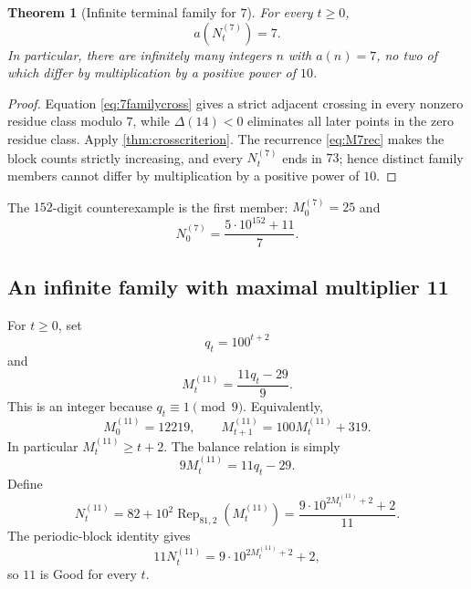 \documentclass[11pt]{article}
\newtheorem{theorem}{Theorem}[section]
\newcommand{\Def}{\Delta}
\begin{document}
\begin{theorem}[Infinite terminal family for $7$]\label{thm:infinite7}
For every $t\ge0$,
\[
 a(N^{(7)}_t)=7.
\]
In particular, there are infinitely many integers $n$ with $a(n)=7$, no two of which differ by multiplication by a positive power of $10$.
\end{theorem}

\begin{proof}
Equation \eqref{eq:7familycross} gives a strict adjacent crossing in every nonzero residue class modulo $7$, while $\Def(14)<0$ eliminates all later points in the zero residue class.  Apply \cref{thm:crosscriterion}.  The recurrence \eqref{eq:M7rec} makes the block counts strictly increasing, and every $N^{(7)}_t$ ends in $73$; hence distinct family members cannot differ by multiplication by a positive power of $10$.
\end{proof}

The $152$-digit counterexample is the first member: $M^{(7)}_0=25$ and
\[
 N^{(7)}_0=\frac{5\cdot10^{152}+11}{7}.
\]

\subsection{An infinite family with maximal multiplier 11}
For $t\ge0$, set
\begin{equation}\label{eq:q11family}
 q_t=100^{t+2}
\end{equation}
and
\begin{equation}\label{eq:M11family}
 M^{(11)}_t=\frac{11q_t-29}{9}.
\end{equation}
This is an integer because $q_t\equiv1\pmod 9$.  Equivalently,
\begin{equation}\label{eq:M11rec}
 M^{(11)}_0=12219,
 \qquad
 M^{(11)}_{t+1}=100M^{(11)}_t+319.
\end{equation}
In particular $M^{(11)}_t\ge t+2$.  The balance relation is simply
\begin{equation}\label{eq:balance11}
 9M^{(11)}_t=11q_t-29.
\end{equation}
Define
\begin{equation}\label{eq:N11family}
 N^{(11)}_t
 =82+10^2\operatorname{Rep}_{81,2}(M^{(11)}_t)
 =\frac{9\cdot10^{2M^{(11)}_t+2}+2}{11}.
\end{equation}
The periodic-block identity gives
\begin{equation}\label{eq:11sparse}
 11N^{(11)}_t=9\cdot10^{2M^{(11)}_t+2}+2,
\end{equation}
so $11$ is Good for every $t$.
\end{document}
